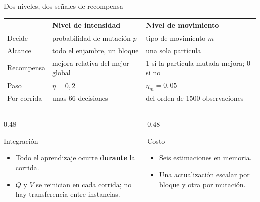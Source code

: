 \documentclass[aspectratio=169,11pt]{beamer}
\newcommand{\dc}{{,}}%
\begin{document}
\begin{frame}{Dos niveles, dos señales de recompensa}
  \centering
  \footnotesize
  \setlength{\tabcolsep}{7pt}
  \renewcommand{\arraystretch}{1.25}
  \begin{tabular}{@{}lll@{}}
    \toprule
    & \textbf{\color{primary}Nivel de intensidad} & \textbf{\color{primary}Nivel de movimiento} \\
    \midrule
    Decide & probabilidad de mutación $p$ & tipo de movimiento $m$ \\
    Alcance & todo el enjambre, un bloque & una sola partícula \\
    Recompensa & mejora relativa del mejor global & 1 si la partícula mutada mejora; 0 si no \\
    Paso & $\eta=0\dc2$ & $\eta_m=0\dc05$ \\
    Por corrida & unas 66 decisiones & del orden de 1500 observaciones \\
    \bottomrule
  \end{tabular}

  \vspace{0.35cm}
  \begin{columns}[t]
    \begin{column}{0.48\textwidth}
      \begin{block}{Integración}
        \footnotesize
        \begin{itemize}
          \item Todo el aprendizaje ocurre \textbf{durante} la corrida.
          \item $Q$ y $V$ se reinician en cada corrida; no hay transferencia entre instancias.
        \end{itemize}
      \end{block}
    \end{column}
    \begin{column}{0.48\textwidth}
      \begin{block}{Costo}
        \footnotesize
        \begin{itemize}
          \item Seis estimaciones en memoria.
          \item Una actualización escalar por bloque y otra por mutación.
        \end{itemize}
      \end{block}
    \end{column}
  \end{columns}
\end{frame}
\end{document}

